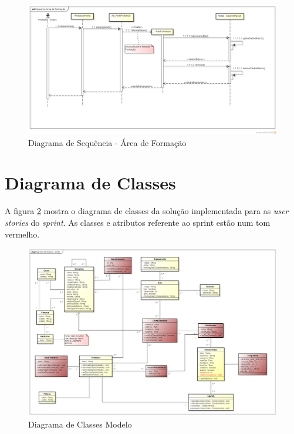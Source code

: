 \documentclass{abnt}
\begin{document}
\begin{landscape}
	\clearpage
		\begin{figure}[h]
		\begin{center}
			\includegraphics[width=650px]{SequenceAreaFormacao}
			\caption{Diagrama de Sequência -  Área de Formação}
			\label{fig:SequenceAreaFormacao}
			\end{center}
		\end{figure}
		\FloatBarrier
	\end{landscape}	
	\clearpage
	
	
		\section{Diagrama de Classes}
		
			A figura \ref{fig:DiagramaClassesModelo} mostra o diagrama de classes da solução implementada para as \emph{user stories} do \emph{sprint}. As classes e atributos referente ao sprint estão num tom vermelho.
			
		\begin{landscape}
			\begin{figure}[h]
				\begin{center}
					 \includegraphics[width=600px]{DiagramaClassesModelo}
					 \caption{Diagrama de Classes Modelo}
					 \label{fig:DiagramaClassesModelo}
				\end{center}
			\end{figure}
		\end{landscape}
\end{document}
